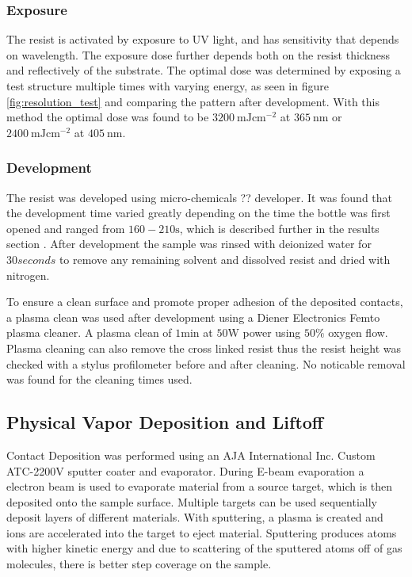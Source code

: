 \subsubsection{Exposure}
The resist is activated by exposure to UV light, and has sensitivity that depends on wavelength. The exposure dose further depends both on the resist thickness and reflectively of the substrate. The optimal dose was determined by exposing a test structure multiple times with varying energy, as seen in figure \ref{fig:resolution_test} and comparing the pattern after development. With this method the optimal dose was found to be $\SI{3200}{\milli \joule \cm^{-2}}$ at $\SI{365}{\nm}$ or $\SI{2400}{\milli \joule \cm^{-2}}$ at $\SI{405}{\nm}$. 

\subsubsection{Development}
 The resist was developed using micro-chemicals ?? developer. It was found that the development time varied greatly depending on the time the bottle was first opened and ranged from $160-210 \si{\second}$, which is described further in the results section {}. After development the sample was rinsed with deionized water for $30 \si{seconds}$ to remove any remaining solvent and dissolved resist and dried with nitrogen. 
 

 To ensure a clean surface and promote proper adhesion of the deposited contacts, a plasma clean was used after development using a Diener Electronics Femto plasma cleaner. A plasma clean of $1 \si{\minute}$ at $50\si{\watt}$ power using $50\%$ oxygen flow.   Plasma cleaning can also remove the cross linked resist thus the resist height was checked with a stylus profilometer before and after cleaning. No noticable removal was found for the cleaning times used. 
 
 \subsection{Physical Vapor Deposition and Liftoff}
 


Contact Deposition was performed using an AJA International Inc. Custom ATC-2200V sputter coater and evaporator. During E-beam evaporation a electron beam is used to evaporate material from a source target, which is then deposited onto the sample surface. Multiple targets can be used sequentially deposit layers of different materials. With sputtering, a plasma is created and ions are accelerated into the target to eject material. Sputtering produces atoms with higher kinetic energy and due to scattering of the sputtered atoms off of gas molecules, there is better step coverage on the sample.

